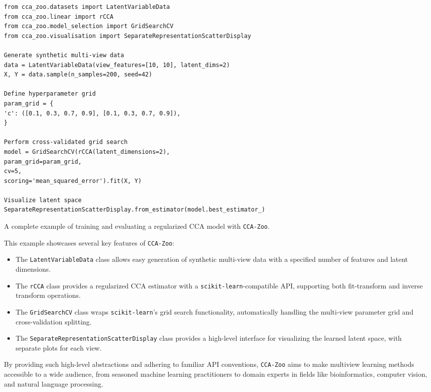 \begin{listing}[ht]
\begin{verbatim}
from cca_zoo.datasets import LatentVariableData
from cca_zoo.linear import rCCA
from cca_zoo.model_selection import GridSearchCV
from cca_zoo.visualisation import SeparateRepresentationScatterDisplay

Generate synthetic multi-view data
data = LatentVariableData(view_features=[10, 10], latent_dims=2)
X, Y = data.sample(n_samples=200, seed=42)

Define hyperparameter grid
param_grid = {
'c': ([0.1, 0.3, 0.7, 0.9], [0.1, 0.3, 0.7, 0.9]),
}

Perform cross-validated grid search
model = GridSearchCV(rCCA(latent_dimensions=2),
param_grid=param_grid,
cv=5,
scoring='mean_squared_error').fit(X, Y)

Visualize latent space
SeparateRepresentationScatterDisplay.from_estimator(model.best_estimator_)
\end{verbatim}
\caption{A complete example of training and evaluating a regularized CCA model with \texttt{CCA-Zoo}.}
\label{lst:cca-zoo-example}
\end{listing}

This example showcases several key features of \texttt{CCA-Zoo}:

\begin{itemize}
\item The \texttt{LatentVariableData} class allows easy generation of synthetic multi-view data with a specified number of features and latent dimensions.
\item The \texttt{rCCA} class provides a regularized CCA estimator with a \texttt{scikit-learn}-compatible API, supporting both fit-transform and inverse transform operations.
\item The \texttt{GridSearchCV} class wraps \texttt{scikit-learn}'s grid search functionality, automatically handling the multi-view parameter grid and cross-validation splitting.
\item The \texttt{SeparateRepresentationScatterDisplay} class provides a high-level interface for visualizing the learned latent space, with separate plots for each view.
\end{itemize}

By providing such high-level abstractions and adhering to familiar API conventions, \texttt{CCA-Zoo} aims to make multiview learning methods accessible to a wide audience, from seasoned machine learning practitioners to domain experts in fields like bioinformatics, computer vision, and natural language processing.

